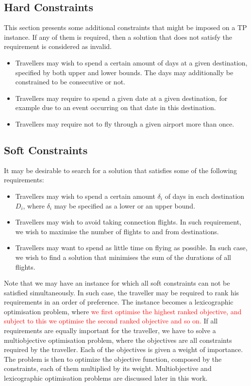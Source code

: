 \documentclass{mprop}
\theoremstyle{definition}
\begin{document}
\subsection{Hard Constraints}
This section presents some additional constraints that might be imposed on a TP instance. If any of them is required, then a solution that does not satisfy the requirement is considered as invalid.

\begin{itemize}
\item Travellers may wish to spend a certain amount of days at a given destination, specified by both upper and lower bounds. The days may additionally be constrained to be consecutive or not.

\item Travellers may require to spend a given date at a given destination, for example due to an event occurring on that date in this destination.

\item Travellers may require not to fly through a given airport more than once.
\end{itemize}

\subsection{Soft Constraints}
It may be desirable to search for a solution that satisfies some of the following requirements:

\begin{itemize}
\item Travellers may wish to spend a certain amount $\delta_{i}$ of days in each destination $D_{i}$, where $\delta_{i}$ may be specified as a lower or an upper bound.

\item Travellers may wish to avoid taking connection flights. In such requirement, we wish to maximise the number of flights to and from destinations.

\item Travellers may want to spend as little time on flying as possible. In such case, we wish to find a solution that minimises the sum of the durations of all flights.
\end{itemize}

Note that we may have an instance for which all soft constraints can not be satisfied simultaneously. In such case, the traveller may be required to rank his requirements in an order of preference. The instance becomes a lexicographic optimisation problem, where
\textcolor{red}{we first optimise the highest ranked objective, and subject to this we optimise the second ranked objective and so on.}
If all requirements are equally important for the traveller, we have to solve a multiobjective optimisation problem, where the objectives are all constraints required by the traveller. Each of the objectives is given a weight of importance. The problem is then to optimize the objective function, composed by the constraints, each of them multiplied by its weight. Multiobjective and lexicographic optimisation problems are discussed later in this work. %
\end{document}
